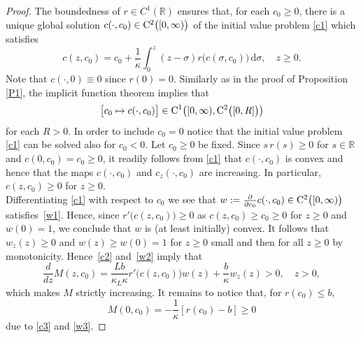 \documentclass[reqno,11pt]{amsart}
\numberwithin{equation}{section}
\newcommand{\R}{\mathbb{R}}
\newcommand{\rd}{\mathrm{d}}
\begin{document}
\begin{proof}
The boundedness of $r\in C^1(\mathbb{R})$ ensures that, for each
$c_0\ge 0$, there is a unique global  solution $c(\cdot,c_0)\in
{\rm C}^2 \bigl( [0,\infty)\bigr)$ of the initial value
problem \eqref{c1} which satisfies
$$
c(z,c_0)=c_0+\frac{1}{\kappa}\int_0^z(z-\sigma) r\bigl(
c(\sigma,c_0)\bigr)\,\rd\sigma,\quad z\ge 0.
$$
Note that $c(\cdot,0)\equiv 0$ since $r(0)=0$. Similarly as in the
proof of Proposition \ref{P1}, the implicit function  theorem implies
that
$$
\bigl[ c_0\mapsto c(\cdot,c_0)\bigr] \in {\rm C}^1\bigl(
[0,\infty), {\rm C}^2\bigl([0,R]\bigr)\bigr)
$$
for each $R>0$. In order to include $c_0=0$ notice that the initial
value problem \eqref{c1} can be solved also for $c_0<0$. Let
$c_0\ge 0$ be fixed. Since $s\, r(s)\ge 0$ for $s\in \R$ and
$c(0,c_0)=c_0\ge 0$, it readily follows from \eqref{c1} that
$c(\cdot,c_0)$ is convex and hence that the maps
$c(\cdot,c_0)$ and $c_z(\cdot,c_0)$ are increasing. In particular,
$c(z,c_0)\geq 0$ for $z\ge 0$. \\[.1cm]
Differentiating \eqref{c1} with respect to $c_0$ we see that
$w:=\frac{\partial}{\partial c_0}c(\cdot,c_0)\in{\rm C}^2\bigl([0,\infty)\bigr)$
satisfies~\eqref{w1}. Hence, since $r'\bigl( c(z,c_0)\bigr)\ge 0$ as
$c(z,c_0)\geq c_0\geq 0$ for $z\ge 0$ and $w(0)=1$, we conclude that
$w$ is (at least initially) convex. It follows that $w_z(z)\geq 0$ and
\mbox{$w(z)\ge w(0)=1$} for $z\geq 0$ small and then for all $z\geq 0$ by
monotonicity. Hence~\eqref{c2} and~\eqref{w2} imply  that
\begin{equation*}
\frac{d}{dz}M(z,c_0)=\frac{Lb}{\kappa_L\kappa}r'\bigl( c(z,c_0)\bigr)
w(z)+\frac{b}{\kappa}w_z(z)> 0, \quad z> 0,
\end{equation*}
which makes $M$ strictly increasing. It remains to notice that, for $r(c_0)\leq
b$,
$$
M(0,c_0)=-\frac{1}{\kappa}\left[ r(c_0)-b \right]\geq 0
$$
due to \eqref{c3} and \eqref{w3}.
\end{proof}
\end{document}
